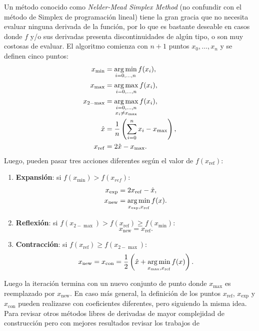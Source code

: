 Un método conocido como \emph{Nelder-Mead Simplex Method} (no confundir con el método de Simplex de programación lineal) tiene la gran gracia que no necesita evaluar ninguna derivada de la función, por lo que es bastante deseable en casos donde \(f\) y/o sus derivadas presenta discontinuidades de algún tipo, o son muy costosas de evaluar. El algoritmo comienza con \(n + 1\) puntos \(x_0, \dotsc, x_n\) y se definen cinco puntos:
\begin{align*}
x_{\min}			&= \operatorname*{\arg\min}_{i=0, \dotsc, n} f(x_i),\\
x_{\max}			&= \operatorname*{\arg\max}_{i=0, \dotsc, n} f(x_i),\\
x_{2-\max}			&= \operatorname*{\arg\max}_{\substack{i=0, \dotsc, n\\ x_i \neq x_{\max}}} f(x_i),\\
\hat{x}				&= \frac{1}{n} \left(\sum_{i=0}^n x_{i} - x_{\max}\right),\\
x_{\mathrm{ref}}	&= 2\hat{x} - x_{\max}.
\end{align*}
Luego, pueden pasar tres acciones diferentes según el valor de \(f(x_{\mathrm{ref}})\):
\begin{enumerate}
	\item \textbf{Expansión}: si \(f(x_{\min}) > f(x_{ref})\):
	\begin{align*}
	x_{\exp}			&= 2 x_{\mathrm{ref}} - \hat{x},\\
	x_{\mathrm{new}}	&= \operatorname*{\arg\min}_{x_{\exp}, x_{\mathrm{ref}}} f(x).
	\end{align*}
	\item \textbf{Reflexión}: si \(f(x_{2-\max}) > f(x_{\mathrm{ref}}) \geq f(x_{\min})\):
	\begin{equation*}
	x_{\mathrm{new}} = x_{\mathrm{ref}}.
	\end{equation*}
	\item \textbf{Contracción}: si \(f(x_{\mathrm{ref}}) \geq f(x_{2-\max})\):
	\begin{equation*}
	x_{\mathrm{new}} = x_{\mathrm{con}} = \frac{1}{2} \left(\hat{x} + \operatorname*{\arg\min}_{x_{\max}, x_{\mathrm{ref}}}f(x)\right).
	\end{equation*}
\end{enumerate}
Luego la iteración termina con un nuevo conjunto de punto donde \(x_{\max}\) es reemplazado por \(x_{\mathrm{new}}\). En caso más general, la definición de los puntos \(x_{\mathrm{ref}}\), \(x_{\exp}\) y \(x_{\mathrm{con}}\) pueden realizarse con coeficientes diferentes, pero siguiendo la misma idea. Para revisar otros métodos libres de derivadas de mayor complejidad de construcción pero con mejores resultados revisar los trabajos de \cite{39}\cite{40}\cite{41}

